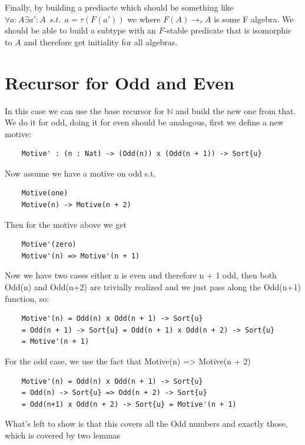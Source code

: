 \documentclass{article}
\begin{document}
Finally, by building a prediacte which should be something like $\forall a:A \exists a' : A\ \ s.t. \ \ a = \tau(F(a'))$ we where $F(A) \rightarrow_{\tau} A$ is some F algebra. We should be able to build a subtype with an $F$-stable predicate that is isomorphic to $A$ and therefore get initiality for all algebras.

\newpage

\section{Recursor for Odd and Even}

In this case we can use the base recursor for $\mathbb{N}$ and build the new one from that.
We do it for odd, doing it for even should be analogous, first we define a new motive:

\begin{verbatim}
    Motive' : (n : Nat) -> (Odd(n)) x (Odd(n + 1)) -> Sort{u}
\end{verbatim}

Now assume we have a motive on odd s.t.

\begin{verbatim}
    Motive(one) 
    Motive(n) -> Motive(n + 2)
\end{verbatim}

Then for the motive above we get 

\begin{verbatim}
    Motive'(zero)
    Motive'(n) => Motive'(n + 1) 
\end{verbatim}

Now we have two cases either n is even and therefore n + 1 odd, then both Odd(n) and Odd(n+2) are trivially realized and we just pass along the Odd(n+1) function, so:

\begin{verbatim}
    Motive'(n) = Odd(n) x Odd(n + 1) -> Sort{u} 
    = Odd(n + 1) -> Sort{u} = Odd(n + 1) x Odd(n + 2) -> Sort{u} 
    = Motive'(n + 1)
\end{verbatim}

For the odd case, we use the fact that Motive(n) => Motive(n + 2)

\begin{verbatim}
    Motive'(n) = Odd(n) x Odd(n + 1) -> Sort{u} 
    = Odd(n) -> Sort{u} => Odd(n + 2) -> Sort{u} 
    = Odd(n+1) x Odd(n + 2) -> Sort{u} = Motive'(n + 1)
\end{verbatim}

What's left to show is that this covers all the Odd numbers and exactly those, which is covered by two lemmas
\end{document}
